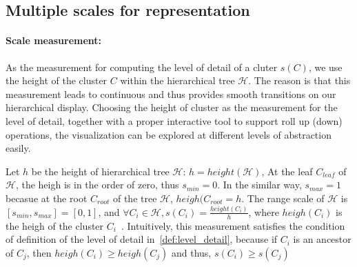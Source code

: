\subsection{Multiple scales for representation}
\paragraph{Scale measurement: }
As the measurement for computing the level of detail of a cluter $s(C)$, we use the height of the cluster $C$ within the hierarchical tree $\mathcal{H}$. The reason is that this measurement leads to continuous and thus provides smooth transitions on our hierarchical display. Choosing the height of cluster as the measurement for the level of detail, together with a proper interactive tool to support roll up (down) operations, the visualization can be explored at different levels of abstraction easily. 

Let $h$ be the height of hierarchical tree $\mathcal{H}$: $h = height(\mathcal{H})$, At the leaf $C_{leaf}$ of $\mathcal{H}$, the heigh is in the order of zero, thus $s_{min} = 0$. In the similar way, $s_{max} = 1$ becasue at the root $C_{root}$ of the tree $\mathcal{H}$, $heigh(C_{root} = h$.  The range scale of $\mathcal{H}$ is $[s_{min}, s_{max}] = [0,1]$, and $\forall C_i \in \mathcal{H}, s(C_i) = \frac{height(C_i)}{h}$, where $heigh(C_i)$ is the heigh of the cluster $C_i$~\cite{yang2003interactive}. Intuitively, this measurement satisfies the condition of definition of the level of detail in~\ref{def:level_detail}, because if $C_i$ is an ancestor of $C_j$, then $heigh(C_i) \geq heigh(C_j)$ and thus, $s(C_i) \geq s(C_j)$

